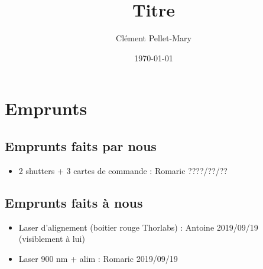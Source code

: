 \documentclass[a4paper]{report}
\title{Titre}
\author{Clément Pellet-Mary}
\date\today
\begin{document}
\chapter{Emprunts}
  \section{Emprunts faits par nous}
  \begin{itemize}
  \item 2 shutters + 3 cartes de commande : Romaric ????/??/??
  \end{itemize}
  \section{Emprunts faits à nous}
  \begin{itemize}
  \item Laser d'alignement (boitier rouge Thorlabs) : Antoine 2019/09/19 (visiblement à lui)
  \item Laser 900 nm + alim : Romaric 2019/09/19
  \end{itemize}

 
  
\end{document}
